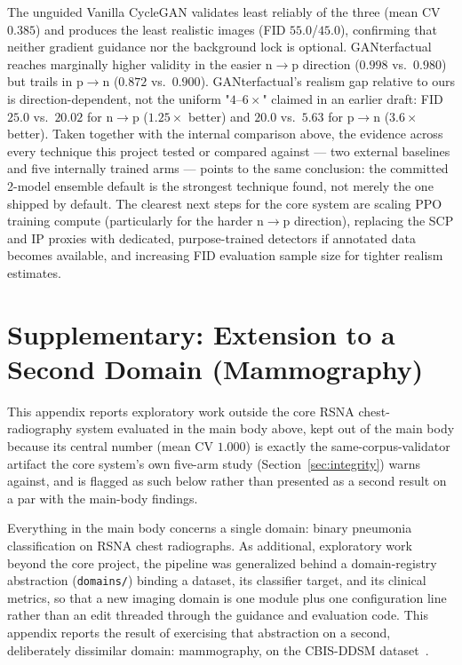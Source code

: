 \documentclass[11pt]{article}
\begin{document}
The unguided Vanilla CycleGAN validates least reliably of the three (mean
CV $0.385$) and produces the least realistic images (FID $55.0$/$45.0$),
confirming that neither gradient guidance nor the background lock is
optional. GANterfactual reaches marginally higher validity in the easier
n$\to$p direction ($0.998$ vs.\ $0.980$) but trails in p$\to$n
($0.872$ vs.\ $0.900$). GANterfactual's realism gap relative to ours is
direction-dependent, not the uniform "$4$--$6\times$" claimed in an
earlier draft: FID $25.0$ vs.\ $20.02$ for n$\to$p ($1.25\times$ better)
and $20.0$ vs.\ $5.63$ for p$\to$n ($3.6\times$ better). Taken together
with the internal comparison above,
the evidence across every technique this project tested or compared
against — two external baselines and five internally trained arms —
points to the same conclusion: the committed 2-model ensemble default is
the strongest technique found, not merely the one shipped by default. The
clearest next
steps for the core system are scaling PPO training
compute (particularly for the harder n$\to$p direction), replacing the
SCP and IP proxies with dedicated, purpose-trained detectors if annotated
data becomes available, and increasing FID evaluation sample size for
tighter realism estimates.

\appendix
\section{Supplementary: Extension to a Second Domain (Mammography)}
\label{sec:breast}

This appendix reports exploratory work outside the core RSNA chest-radiography
system evaluated in the main body above, kept out of the main body because
its central number (mean CV $1.000$) is exactly the same-corpus-validator
artifact the core system's own five-arm study (Section~\ref{sec:integrity})
warns against, and is flagged as such below rather than presented as a
second result on a par with the main-body findings.

Everything in the main body concerns a single domain: binary pneumonia
classification on RSNA chest radiographs. As additional, exploratory work
beyond the core project, the pipeline was generalized behind a
domain-registry abstraction (\texttt{domains/}) binding a dataset, its
classifier target, and its clinical metrics, so that a new imaging domain
is one module plus one configuration line rather than an edit threaded
through the guidance and evaluation code. This appendix reports the
result of exercising that abstraction on a second, deliberately
dissimilar domain: mammography, on the CBIS-DDSM
dataset~\cite{lee2017cbisddsm}.
\end{document}
